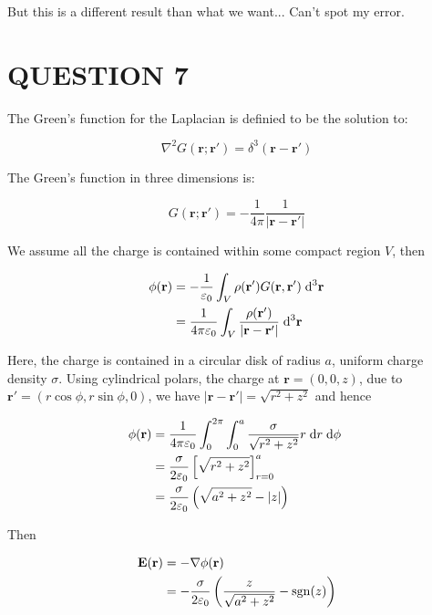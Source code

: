 \documentclass[a4paper]{article}
\begin{document}
But this is a different result than what we want... Can't spot my error. 




\section{QUESTION 7}

The Green's function for the Laplacian is definied to be the solution to:

\[ \nabla^{2} G(\mathbf{r};\mathbf{r}') = \delta^{3} (\mathbf{r} - \mathbf{r}')  \]

The Green's function in three dimensions is:

\[ G(\mathbf{r};\mathbf{r}') = - \frac{1}{4 \pi} \frac{1}{| \mathbf{r} - \mathbf{r}' |}  \]

We assume all the charge is contained within some compact region $ V $, then

\begin{align*}
\phi(\mathbf{r}) & = - \frac{1}{\varepsilon_{0}} \int_{V} \rho(\mathbf{r}') G(\mathbf{r},\mathbf{r}') \; \mathrm{d}^{3} \mathbf{r} \\
& = \frac{1}{4 \pi \varepsilon_{0}} \int_{V} \frac{\rho(\mathbf{r}')}{| \mathbf{r} - \mathbf{r}' |} \; \mathrm{d}^{3} \mathbf{r}
\end{align*}

Here, the charge is contained in a circular disk of radius $ a $, uniform charge density $ \sigma $. Using cylindrical polars, the charge at $ \mathbf{r} = (0,0,z) $, due to $ \mathbf{r}' = (r \cos \phi, r \sin \phi,0) $, we have $ | \mathbf{r} - \mathbf{r}' | = \sqrt{r^{2} + z^{2}} $ and hence

\begin{align*}
\phi(\mathbf{r}) & = \frac{1}{4 \pi \varepsilon_{0}} \int_{0}^{2\pi} \int_{0}^{a} \frac{\sigma}{\sqrt{r^{2} + z^{2}}} r \; \mathrm{d} r \;  \mathrm{d} \phi  \ \\
& = \frac{\sigma}{2 \varepsilon_{0}} \left[  \sqrt{r^{2} + z^{2}} \right]_{r=0}^{a} \\
& = \frac{\sigma}{2 \varepsilon_{0}} \left( \sqrt{a^{2} + z^{2}} - | z |  \right) 
\end{align*}

Then 

\begin{align*}
\mathbf{E}(\mathbf{r}) & = - \nabla  \phi (\mathbf{r}) \\
& = - \frac{\sigma}{2 \varepsilon_{0}} \left( \frac{z}{\sqrt{a^{2} + z^{2}}} - \operatorname{sgn} (z)  \right) 
\end{align*}
\end{document}
